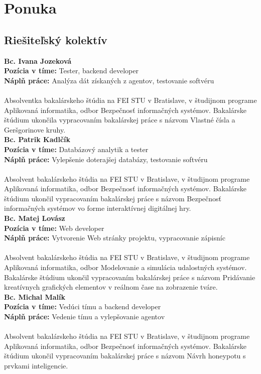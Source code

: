 \documentclass[a4paper,12pt]{article}
\begin{document}
\section{Ponuka}
\subsection{Riešiteľský kolektív}
\textbf{Bc. Ivana Jozeková} \\
\textbf{Pozícia v tíme: } Tester, backend developer \\ 
\textbf{Náplň práce:} Analýza dát získaných z agentov, testovanie softvéru \\ \\
Absolventka bakalárskeho štúdia na FEI STU v Bratislave, v študijnom programe Aplikovaná informatika, odbor Bezpečnosť informačných systémov. Bakalárske štúdium ukončila vypracovaním bakalárskej práce s názvom Vlastné čísla a Geršgorinove kruhy. \\ 

\noindent \textbf{Bc. Patrik Kadlčík} \\
\textbf{Pozícia v tíme: } Databázový analytik a tester  \\
\textbf{Náplň práce:} Vylepšenie doterajšej databázy, testovanie softvéru \\ \\
Absolvent bakalárskeho štúdia na FEI STU v Bratislave, v študijnom programe Aplikovaná informatika, odbor Bezpečnosť informačných systémov. Bakalárske štúdium ukončil vypracovaním bakalárskej práce s názvom Bezpečnosť informačných systémov vo forme interaktívnej digitálnej hry. \\ 

\noindent \textbf{Bc. Matej Lovász} \\
\textbf{Pozícia v tíme: } Web developer \\ 
\textbf{Náplň práce:} Vytvorenie Web stránky projektu, vypracovanie zápisníc \\ \\
Absolvent bakalárskeho štúdia na FEI STU v Bratislave, v študijnom programe Aplikovaná informatika, odbor Modelovanie a simulácia udalostných systémov. Bakalárske štúdium ukončil vypracovaním bakalárskej práce s názvom Pridávanie kreatívnych grafických elementov v reálnom čase na zobrazenie tváre. \\ 

\noindent \textbf{Bc. Michal Malík} \\
\textbf{Pozícia v tíme: } Vedúci tímu a backend developer \\ 
\textbf{Náplň práce:} Vedenie tímu a vylepšovanie agentov \\ \\
Absolvent bakalárskeho štúdia na FEI STU v Bratislave, v študijnom programe Aplikovaná informatika, odbor Bezpečnosť informačných systémov. Bakalárske štúdium ukončil vypracovaním bakalárskej práce s názvom Návrh honeypotu s prvkami inteligencie. \\ 
\end{document}
